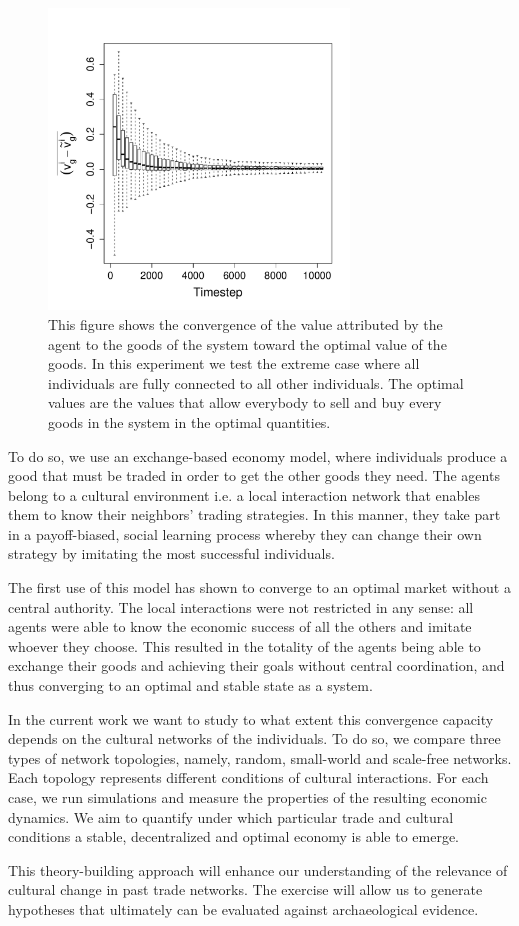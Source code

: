 \documentclass[a4paper,10pt]{report}
\begin{document}
\begin{figure}[h!]
	\center
	\includegraphics[width=8cm]{img/ClearingPriceDistanceEvolutionForTrade-G3N500.pdf}
\caption{This figure shows the convergence of the value attributed by the agent to the goods of the system toward the optimal value of the goods. In this experiment we test the extreme case where all individuals are fully connected to all other individuals. The optimal values are the values that allow everybody to sell and buy every goods in the system in the optimal quantities.}
\end{figure}

To do so, we use an exchange-based economy model, where individuals produce a good that must be traded in order to get the other goods they need. The agents belong to a cultural environment i.e. a local interaction network that enables them to know their neighbors' trading strategies. In this manner, they take part in a payoff-biased, social learning process whereby they can change their own strategy by imitating the most successful individuals.

The first use of this model has shown to converge to an optimal market without a central authority. The local interactions  were not restricted in any sense: all agents were able to know the economic success  of all the others and imitate whoever they choose. This resulted in the totality of the agents being able to exchange their goods and achieving their goals without central coordination, and thus converging to an optimal and stable state as a system.

In the current work we want to study to what extent this convergence capacity depends on the cultural networks of the individuals. To do so, we compare three types of network topologies, namely, random, small-world and scale-free networks. Each topology represents different conditions of cultural interactions. For each case, we run simulations and measure the properties of the resulting economic dynamics. We aim to quantify under which particular trade and cultural conditions a stable, decentralized and optimal economy is able to emerge.

This theory-building approach will enhance our understanding of the relevance of cultural change in past trade networks. The exercise will allow us to generate hypotheses that ultimately can be evaluated against archaeological evidence.
\end{document}
